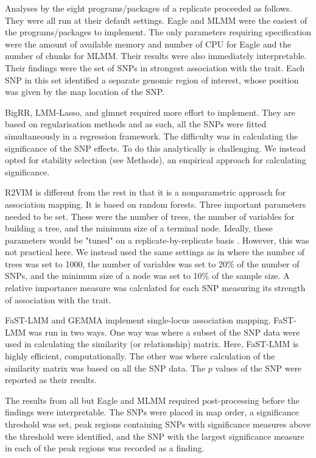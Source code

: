 \documentclass{article}
\begin{document}
 Analyses by the eight programs/packages of a replicate proceeded as follows. They were all run at their default settings. 
 Eagle and MLMM were the easiest of the programs/packages to implement. 
 The only parameters requiring specification were the amount of available memory and number of CPU for 
 Eagle and the number of chunks for MLMM. 
 Their results were also immediately 
 interpretable. Their findings were the set of SNPs in strongest association with the trait. Each 
SNP in this set identified a separate genomic region of interest, whose position was given by the map location of the SNP.  

BigRR, LMM-Lasso, and glmnet required more effort to implement. They are based on regularisation methods and as such, all the SNPs were fitted simultaneously in a regression 
framework. The difficulty was in calculating the significance of the SNP effects. To do this analytically is challenging. We instead opted for stability selection (see Methods),  
an empirical approach for calculating significance. 

R2VIM is different from the rest in that it is a nonparametric approach for association mapping. It is based on random forests. Three important parameters needed to be  set. 
These were the number of trees, the number of variables for building a tree, and the minimum size of a terminal node. Ideally, these parameters would be "tuned" on a replicate-by-replicate 
basis \cite{boulesteix2012overview}. However, this was not practical here. We instead used the same settings as in \cite{szymczak2016r2vim} where 
the number of trees was set to 1000, the number of variables was set to 20\% of the number of SNPs, and 
  the minimum size of a node was set to 10\% of the sample size.
A relative importance measure was calculated 
for each SNP measuring its strength of association with the trait.

FaST-LMM and GEMMA implement single-locus association mapping. FaST-LMM was run in two ways. One way was where a subset of the SNP data were used in calculating the similarity (or relationship) matrix. Here, FaST-LMM is highly efficient, computationally. The other was where calculation of the similarity matrix was based on all the SNP data. The $p$ values of the SNP were reported as their results. 


The results from all but Eagle and MLMM required post-processing before the findings were interpretable.  The SNPs were placed in map order, 
a significance threshold was set, peak regions containing SNPs with significance measures above the threshold were identified, and the SNP with the largest 
significance measure in each of the peak regions was recorded as a finding. 
\end{document}
